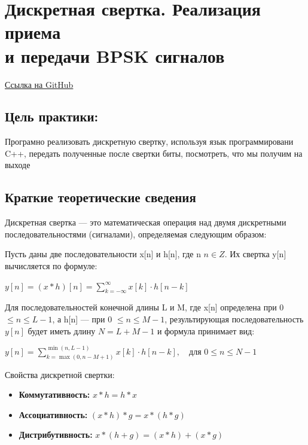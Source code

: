 \chapter[Дискретная свертка. Реализация приема и передачи BPSK сигналов]{Дискретная свертка. Реализация приема\\ и передачи BPSK сигналов}

\begin{leftbar}
    \href{https://github.com/someotb/sdr}{Ссылка на GitHub}
\end{leftbar}

\section*{Цель практики:}

Програмно реализовать дискретную свертку, используя язык программировани C++,
передать полученные после свертки биты, посмотреть, что мы получим на выходе

\section*{Краткие теоретические сведения}

Дискретная свертка — это математическая операция над двумя дискретными последовательностями (сигналами), определяемая следующим образом:

Пусть даны две последовательности x[n] и h[n], где n $n\in{Z}$. Их свертка y[n] вычисляется по формуле:

\vspace{20pt}

$y[n] = (x * h)[n] = \sum_{k=-\infty}^{\infty} x[k] \cdot h[n - k]$

\vspace{20pt}

Для последовательностей конечной длины L и M, где x[n] определена при 0 $\leq n \leq L-1$, а  h[n] — при 0 $\leq n \leq M-1$, результирующая последовательность \( y[n] \) будет иметь длину \( N = L + M - 1 \) и формула принимает вид:

\vspace{20pt}

$y[n] = \sum_{k=\max(0, n-M+1)}^{\min(n, L-1)} x[k] \cdot h[n - k], \quad \text{для } 0 \leq n \leq N-1$

\vspace{20pt}

Свойства дискретной свертки:
\begin{itemize}
    \item \textbf{Коммутативность:} \( x * h = h * x \)
    \item \textbf{Ассоциативность:} \( (x * h) * g = x * (h * g) \)
    \item \textbf{Дистрибутивность:} \( x * (h + g) = (x * h) + (x * g) \)
\end{itemize}

